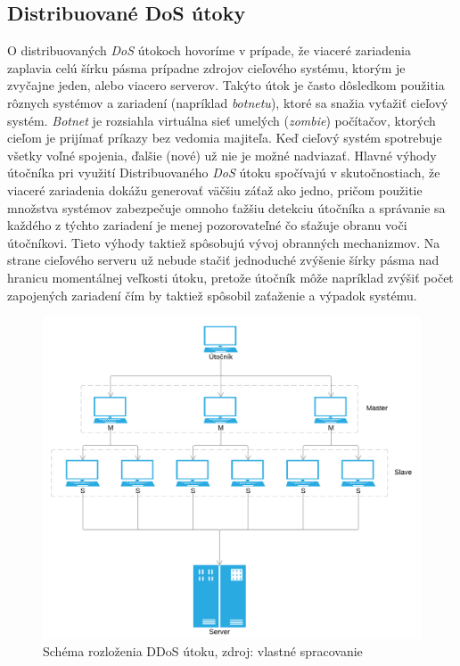 \documentclass[
  printed, %
  table,   %
  lof,     %
  lot,     %
]{fithesis3}
\begin{document}
\subsection{Distribuované DoS útoky}
O distribuovaných \textit{DoS} útokoch hovoríme v prípade, že viaceré zariadenia zaplavia
celú šírku pásma prípadne zdrojov cieľového systému, ktorým je zvyčajne jeden, alebo viacero
serverov. Takýto útok je často dôsledkom použitia rôznych systémov a zariadení (napríklad
\textit{botnetu}), ktoré sa snažia vyťažiť cieľový systém. \textit{Botnet} je rozsiahla
virtuálna sieť umelých (\textit{zombie}) počítačov, ktorých cieľom je prijímať príkazy bez
vedomia majiteľa. Keď cieľový systém spotrebuje všetky voľné spojenia, ďalšie (nové) už nie
je možné nadviazať. Hlavné výhody útočníka pri využití Distribuovaného \textit{DoS} útoku
spočívajú v skutočnostiach, že viaceré zariadenia dokážu generovať väčšiu záťaž ako jedno,
pričom použitie množstva systémov zabezpečuje omnoho ťažšiu detekciu útočníka a správanie
sa každého z týchto zariadení je menej pozorovateľné čo sťažuje obranu voči útočníkovi.
Tieto výhody taktiež spôsobujú vývoj obranných mechanizmov. Na strane cieľového serveru už
nebude stačiť jednoduché zvýšenie šírky pásma nad hranicu momentálnej veľkosti útoku, pretože
útočník môže napríklad zvýšiť počet zapojených zariadení čím by taktiež spôsobil zaťaženie a
výpadok systému.

\begin{figure}[H]
  \centering
    \includegraphics[width=\textwidth]{images/ddos.png}
  \caption{Schéma rozloženia DDoS útoku, zdroj: vlastné spracovanie}
  \label{fig:cs-basic}
\end{figure}
\end{document}
